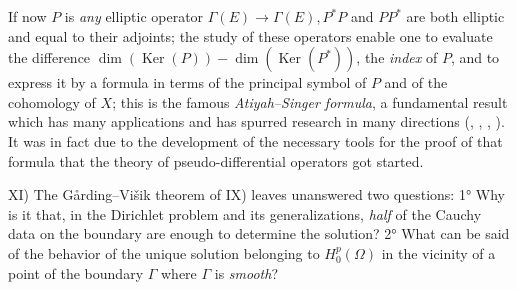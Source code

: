 \documentclass[12pt,a4paper,leqno,twoside]{extbook}
\newcommand{\Ker}{\operatorname{Ker}}
\begin{document}
If now \(P\) is \emph{any} elliptic operator \(\Gamma(E) \to \Gamma(E), P^* P\) and \(PP^*\) are both elliptic and equal to their adjoints; the study of these operators enable one to evaluate the difference \(\dim(\Ker(P)) - \dim(\Ker(P^*))\), the \emph{index} of \(P\), and to express it by a formula in terms of the principal symbol of \(P\) and of the cohomology of \(X\); this is the famous \emph{Atiyah--Singer formula}, a fundamental result which has many applications and has spurred research in many directions (\cite{010}, \cite{031}, \cite{198}, \cite{199}). It was in fact due to the development of the necessary tools for the proof of that formula that the theory of pseudo-differential operators got started.

XI) The Gårding--Višik theorem of IX) leaves unanswered two questions: 1° Why is it that, in the Dirichlet problem and its generalizations, \emph{half} of the Cauchy data on the boundary are enough to determine the solution? 2° What can be said of the behavior of the unique solution belonging to \(H^p_0(\Omega)\) in the vicinity of a point of the boundary \(\Gamma\) where \(\Gamma\) is \emph{smooth}?
\end{document}
